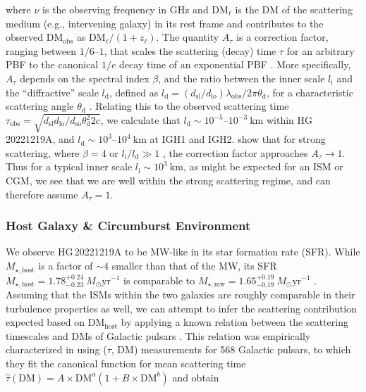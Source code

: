 \documentclass[twocolumn, linenumbers, tra]{aastex631}
\newcommand{\rev}[1]{{\color{purple}#1}}
\begin{document}
\noindent
where $\nu$ is the observing frequency in GHz and $\mathrm{DM}_{\ell}$ is the DM of the \rev{scattering medium (e.g., intervening galaxy)} in its rest frame and contributes to the observed $\mathrm{DM}_{\mathrm{obs}}$ as $\mathrm{DM}_{\ell} /\left(1+z_{\ell}\right)$. \rev{The quantity $A_\tau$ is a correction factor, ranging between $1/6$--$1$, that scales the scattering (decay) time $\tau$ for an arbitrary PBF to the canonical $1/e$ decay time of an exponential PBF \citep{Ocker2021, Cordes2022, Geiger2024}. More specifically, $A_\tau$ depends on the spectral index $\beta$, and the ratio between the inner scale $l_{\mathrm{i}}$ and the ``diffractive'' scale $l_{\mathrm{d}}$, defined as $l_{\mathrm{d}} = (d_{\mathrm{sl}}/d_{\mathrm{lo}})\lambda_{\mathrm{obs}}/2\pi \theta_{\mathrm{d}}$, for a characteristic scattering angle $\theta_{\mathrm{d}}$ \citep{Rickett1990}. Relating this to the observed scattering time $\tau_{\mathrm{obs}} = \sqrt{d_{\mathrm{sl}} d_{\mathrm{lo}}/ d_{\mathrm{so}}\theta_{\mathrm{d}}^2{2 c}}$, we calculate that $l_{\mathrm{d}} \sim 10^{-5}$--$10^{-3}\ \mathrm{km}$ within HG\,20221219A, and $l_{\mathrm{d}} \sim 10^{3}$--$10^{4}\ \mathrm{km}$ at IGH1 and IGH2. \citet{Cordes2022} show that for strong scattering, where $\beta = 4$ or $l_{\mathrm{i}}/l_{\mathrm{d}} \gg 1$ \citep[consistent with a square-law structure function and our pulse model in Eq.~\ref{eq:expgauss};][]{Rickett1990}, the correction factor approaches $A_\tau \rightarrow 1$. Thus for a typical inner scale $l_{\mathrm{i}} \sim 10^3\ \mathrm{km}$, as might be expected for an ISM or CGM, we see that we are well within the strong scattering regime, and can therefore assume $A_\tau=1$.}

\subsubsection{Host Galaxy \& Circumburst Environment}\label{sec:hostscat}

We observe HG\,20221219A to be MW-like in its star formation rate (SFR). While $M_{\star, \mathrm{host}}$ is a factor of $ \sim 4$ smaller than that of the MW, its SFR $\dot{M}_{\star, \mathrm{host}} = 1.78_{-0.23}^{+0.24} \ M_\odot \mathrm{yr}^{-1}$ is comparable to $\dot{M}_{\star, \mathrm{mw}} = 1.65^{+0.19}_{-0.19} \ M_\odot \mathrm{yr}^{-1}$ \citep{Licquia2015}. Assuming that the ISMs within the two galaxies are roughly comparable in their turbulence properties as well, we can attempt to infer the scattering contribution expected based on DM$_{\mathrm{host}}$ by applying a known relation between the scattering timescales and DMs of Galactic pulsars \citep[henceforth referred to as the $\tau$--$\mathrm{DM}$ relation;][]{Sutton1971, Rickett1977, Cordes1991, Bhat2004}. This relation was empirically characterized in \citet{Cordes2016} using ($\tau$, $\mathrm{DM}$) measurements for 568 Galactic pulsars, to which they fit the canonical function for mean scattering time $\widehat{\tau}(\mathrm{DM})=A \times \mathrm{DM}^a\left(1+B \times \mathrm{DM}^b\right)$ \citep{Ramachandran1997} and obtain
\end{document}
